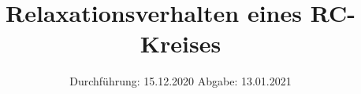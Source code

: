 

\usepackage{pdfpages} %

\subject{V353}
\title{Relaxationsverhalten eines RC-Kreises}
\date{%
  Durchführung: 15.12.2020
  \hspace{3em}
  Abgabe: 13.01.2021
}



\maketitle
\thispagestyle{empty}
\tableofcontents
\newpage






\printbibliography{}




